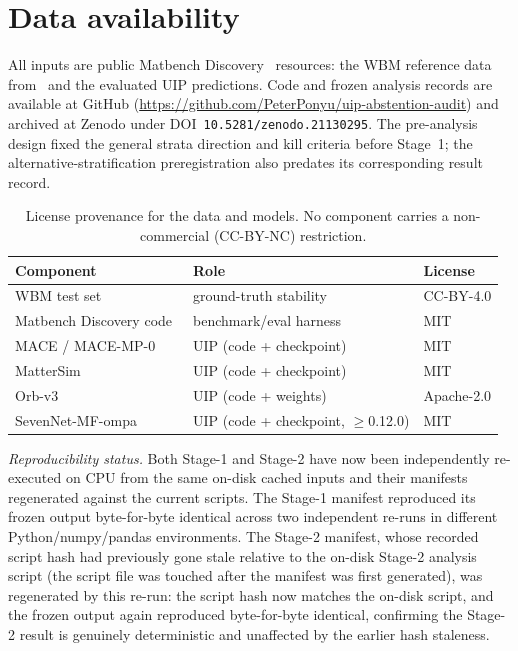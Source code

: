 \documentclass[aip,jcp,preprint,superscriptaddress,amsmath,amssymb]{revtex4-2}
\begin{document}
\section*{Data availability}

All inputs are public Matbench Discovery~\citep{riebesell2025} resources: the WBM reference data from~\citep{wang2021} and the evaluated UIP predictions. Code and frozen analysis records are available at GitHub (\url{https://github.com/PeterPonyu/uip-abstention-audit}) and archived at Zenodo under DOI~\texttt{10.5281/zenodo.21130295}. The pre-analysis design fixed the general strata direction and kill criteria before Stage~1; the alternative-stratification preregistration also predates its corresponding result record.

\begin{table}[!ht]
  \centering
  \caption{License provenance for the data and models. No component carries a
  non-commercial (CC-BY-NC) restriction.}
  \label{tab:licenses}
  \begin{tabular}{lll}
    \toprule
    Component & Role & License \\
    \midrule
    WBM test set~\citep{wang2021}          & ground-truth stability & CC-BY-4.0 \\
    Matbench Discovery code~\citep{riebesell2025} & benchmark/eval harness & MIT \\
    MACE / MACE-MP-0~\citep{batatia2022mace} & UIP (code + checkpoint) & MIT \\
    MatterSim~\citep{yang2024mattersim}     & UIP (code + checkpoint) & MIT \\
    Orb-v3~\citep{rhodes2025orbv3}          & UIP (code + weights)   & Apache-2.0 \\
    SevenNet-MF-ompa~\citep{park2024sevennet,sevennet} & UIP (code + checkpoint, $\ge$0.12.0) & MIT \\
    \bottomrule
  \end{tabular}
\end{table}

\noindent\textit{Reproducibility status.} Both Stage-1 and Stage-2 have now
been independently re-executed on CPU from the same on-disk cached inputs and their
manifests regenerated against the current scripts. The Stage-1 manifest reproduced its
frozen output byte-for-byte identical across two independent re-runs in different
Python/numpy/pandas environments. The Stage-2 manifest, whose recorded script hash had
previously gone stale relative to the on-disk Stage-2 analysis script (the script file
was touched after the manifest was first generated), was regenerated by this re-run: the
script hash now matches the on-disk script, and the frozen output again reproduced
byte-for-byte identical, confirming the Stage-2 result is genuinely deterministic and
unaffected by the earlier hash staleness.
\end{document}
